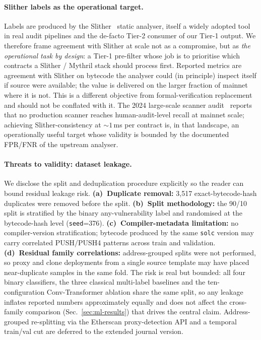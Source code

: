 \documentclass[twocolumn, 10pt]{article}
\begin{document}
\paragraph{Slither labels as the operational target.}
Labels are produced by the Slither~\cite{slither} static analyser,
itself a widely adopted tool in real audit pipelines and the
de-facto Tier-2 consumer of our Tier-1 output. We therefore frame
agreement with Slither at scale not as a compromise, but as
\emph{the operational task by design}: a Tier-1 pre-filter whose
job is to prioritise which contracts a Slither / Mythril stack
should process first. Reported metrics are agreement with Slither
on bytecode the analyser could (in principle) inspect itself if
source were available; the value is delivered on the larger
fraction of mainnet where it is not. This is a different objective
from formal-verification replacement and should not be conflated
with it. The 2024 large-scale scanner audit~\cite{scannerstudy}
reports that no production scanner reaches human-audit-level
recall at mainnet scale; achieving Slither-consistency at
${\sim}1$\,ms per contract is, in that landscape, an
operationally useful target whose validity is bounded by the
documented FPR/FNR of the upstream analyser.

\paragraph{Threats to validity: dataset leakage.}
We disclose the split and deduplication procedure explicitly so the
reader can bound residual leakage risk.
\textbf{(a)~Duplicate removal:} 3{,}517 exact-bytecode-hash
duplicates were removed before the split.
\textbf{(b)~Split methodology:} the 90/10 split is stratified by the
binary any-vulnerability label and randomised at the bytecode-hash
level (\texttt{seed}=376).
\textbf{(c)~Compiler-metadata limitation:} no compiler-version
stratification; bytecode produced by the same \texttt{solc} version
may carry correlated PUSH/PUSH4 patterns across train and
validation.
\textbf{(d)~Residual family correlations:} address-grouped splits
were not performed, so proxy and clone deployments from a single
source template may have placed near-duplicate samples in the same
fold. The risk is real but bounded: all four binary classifiers,
the three classical multi-label baselines and the ten-configuration
Conv-Transformer ablation share the same split, so any leakage
inflates reported numbers approximately equally and does not affect
the cross-family comparison (Sec.~\ref{sec:ml-results}) that drives
the central claim. Address-grouped re-splitting via the Etherscan
proxy-detection API and a temporal train/val cut are deferred to
the extended journal version.
\end{document}
